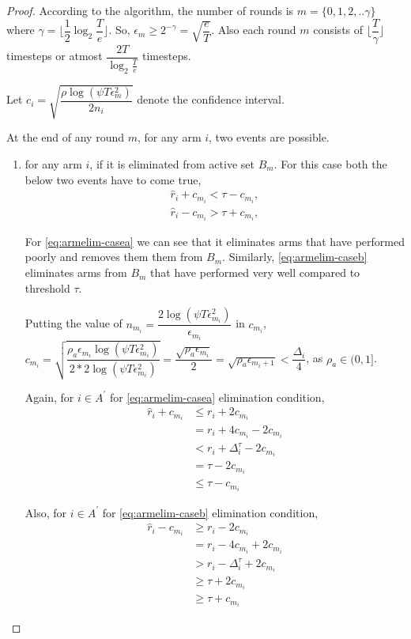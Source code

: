 \begin{proof}

According to the algorithm, the number of rounds is $m=\lbrace 0,1,2,.. \gamma\rbrace $ where $\gamma=\big\lfloor \dfrac{1}{2}\log_{2} \dfrac{T}{e}\big\rfloor$. So, $\epsilon_{m}\geq 2^{-\gamma} = \sqrt{\dfrac{e}{T}}$. Also each round $m$ consists of $\lfloor \dfrac{T}{\gamma}\rfloor$ timesteps or atmost $\dfrac{2T}{\log_{2}\frac{T}{e}}$ timesteps.

Let $c_{i}= \sqrt{\dfrac{\rho\log{(\psi T\epsilon_{m}^{2})}}{2 n_{i}}}$ denote the confidence interval.

At the end of any round $m$, for any arm $i$, two events are possible.
\begin{enumerate}
\item for any arm $i$, if it is eliminated from active set $B_{m}$. For this case both the below two events have to come true,
\begin{align}
\hat{r}_{i} + c_{m_{i}} < \tau - c_{m_{i}}, \label{eq:armelim-casea}\\
\hat{r}_{i} - c_{m_{i}} > \tau + c_{m_{i}}, \label{eq:armelim-caseb}
\end{align}

For \ref{eq:armelim-casea} we can see that it eliminates arms that have performed poorly and removes them them from $B_{m}$. Similarly, \ref{eq:armelim-caseb} eliminates arms from $B_{m}$ that have performed very well compared to threshold $\tau$.

Putting the value of $n_{m_{i}}=\dfrac{2\log{(\psi T\epsilon_{m_{i}}^{2})}}{\epsilon_{m_{i}}}$ in $c_{m_{i}}$,
$c_{m_{i}}=\sqrt{\dfrac{\rho_{a}\epsilon_{m_{i}}\log (\psi T\epsilon_{m_{i}}^{2})}{2*2 \log(\psi T\epsilon_{m_{i}}^{2})}}=\dfrac{\sqrt{\rho_{a}\epsilon_{m_{i}}}}{2} = \sqrt{\rho_{a}\epsilon_{m_{i}+1}} < \dfrac{\Delta_{i}}{4} $, as $\rho_{a}\in (0,1]$.

Again, for ${i} \in A^{'}$ for \ref{eq:armelim-casea} elimination condition, 
\begin{align*}
\hat{r}_{i} + c_{m_{i}}&\leq r_{i} + 2c_{m_{i}} \\
&= r_{i} + 4c_{m_{i}} - 2c_{m_{i}} \\
&< r_{i} + \Delta_{i}^{\tau} - 2c_{m_{i}}\\
&= \tau -2c_{m_{i}} \\
&\leq \tau - c_{m_{i}}
\end{align*}

Also, for ${i} \in A^{'}$ for \ref{eq:armelim-caseb} elimination condition, 
\begin{align*}
\hat{r}_{i} - c_{m_{i}}&\geq r_{i} - 2c_{m_{i}} \\
&= r_{i} - 4c_{m_{i}} + 2c_{m_{i}} \\
&> r_{i} - \Delta_{i}^{\tau} + 2c_{m_{i}}\\
&\geq \tau + 2c_{m_{i}} \\
&\geq \tau + c_{m_{i}}
\end{align*}


\end{enumerate}
\end{proof}
